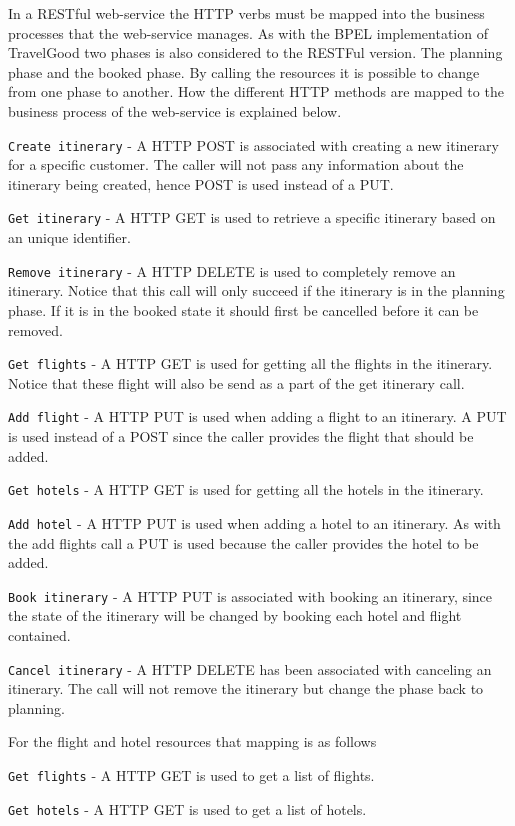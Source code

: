 \noindent
In a RESTful web-service the HTTP verbs must be mapped into the business processes that the web-service manages. As with the BPEL implementation of TravelGood two phases is also considered to the RESTFul version. The planning phase and the booked phase. By calling the resources it is possible to change from one phase to another. How the different HTTP methods are mapped to the business process of the web-service is explained below.
\begin{description}
	\item \texttt{Create itinerary} - A HTTP POST is associated with creating a new itinerary for a specific customer. The caller will not pass any information about the itinerary being created, hence POST is used instead of a PUT. 
	\item \texttt{Get itinerary} - A HTTP GET is used to retrieve a specific itinerary based on an unique identifier.
	\item \texttt{Remove itinerary} - A HTTP DELETE is used to completely remove an itinerary. Notice that this call will only succeed if the itinerary is in the planning phase. If it is in the booked state it should first be cancelled before it can be removed.
	\item \texttt{Get flights} - A HTTP GET is used for getting all the flights in the itinerary. Notice that these flight will also be send as a part of the get itinerary call.
	\item \texttt{Add flight} - A HTTP PUT is used when adding a flight to an itinerary. A PUT is used instead of a POST since the caller provides the flight that should be added.
	\item \texttt{Get hotels} -  A HTTP GET is used for getting all the hotels in the itinerary.
	\item \texttt{Add hotel} - A HTTP PUT is used when adding a hotel to an itinerary. As with the add flights call a PUT is used because the caller provides the hotel to be added.
	\item \texttt{Book itinerary} - A HTTP PUT is associated with booking an itinerary, since the state of the itinerary will be changed by booking each hotel and flight contained.
	\item \texttt{Cancel itinerary} - A HTTP DELETE has been associated with canceling an itinerary. The call will not remove the itinerary but change the phase back to planning.
\end{description}
For the flight and hotel resources that mapping is as follows
\begin{description}
	\item \texttt{Get flights} - A HTTP GET is used to get a list of flights.
	\item \texttt{Get hotels} - A HTTP GET is used to get a list of hotels.	
\end{description}

